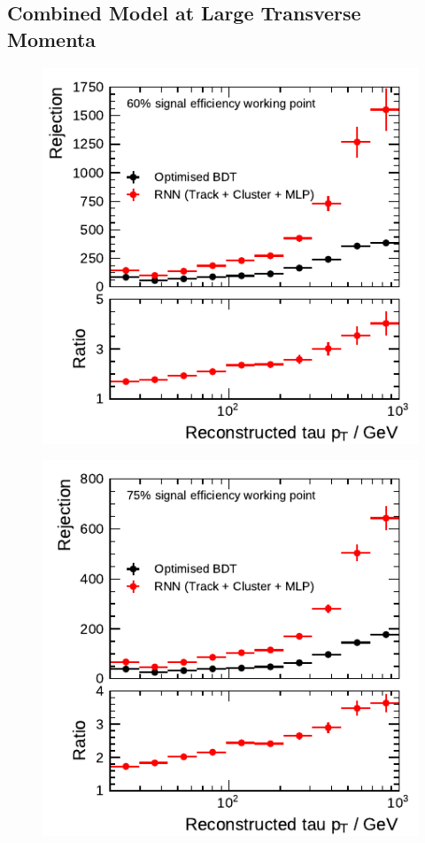 \clearpage
\subsection{Combined Model at Large Transverse Momenta}

\noindent
\begin{minipage}{\textwidth}
  \captionsetup{type=figure}
  \begin{subfigure}[t]{0.48\textwidth}
    \centering
    \includegraphics{./figures/rnn/combined/highpt/rnn_tight_1p.pdf}
  \end{subfigure}\hfill
  \begin{subfigure}[t]{0.48\textwidth}
    \centering
    \includegraphics{./figures/rnn/combined/highpt/rnn_medium_1p.pdf}

\end{subfigure}
\end{minipage}
